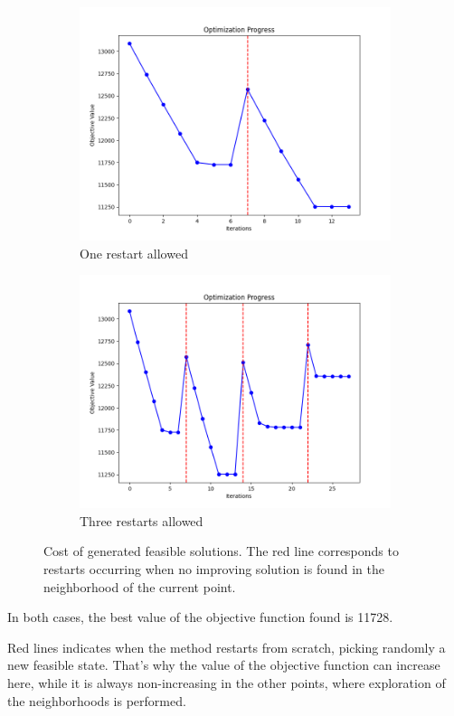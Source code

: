 \documentclass{article}
\begin{document}
\begin{figure}[H]
    \centering
    \begin{subfigure}[t]{0.45\textwidth}  %
        \centering
        \includegraphics[width=\textwidth]{img/1_restart.png}
        \caption{One restart allowed}
    \end{subfigure}
    \hspace{1cm} %
    \begin{subfigure}[t]{0.45\textwidth}
        \centering
        \includegraphics[width=\textwidth]{img/3_restarts.png}
        \caption{Three restarts allowed}
    \end{subfigure}
    \caption{Cost of generated feasible solutions. The red line corresponds to restarts occurring when no improving solution is found in the neighborhood of the current point.}
    \label{GRASP}
\end{figure}

In both cases, the best value of the objective function found is 11728.

Red lines indicates when the method restarts from scratch, picking randomly a new feasible state. That's why the 
value of the objective function can increase here, while it is always non-increasing in the other points, where exploration of the 
neighborhoods is performed.
\end{document}
